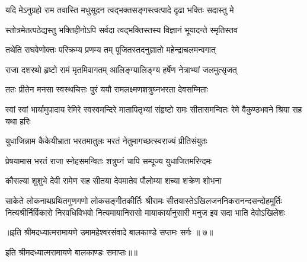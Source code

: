 \twolineshloka
{यदि मेऽनुग्रहो राम तवास्ति मधुसूदन}
{त्वद्भक्तसङ्गस्त्वत्पादे दृढा भक्तिः सदास्तु मे} %

\twolineshloka
{स्तोत्रमेतत्पठेद्यस्तु भक्तिहीनोऽपि सर्वदा}
{त्वद्भक्तिस्तस्य विज्ञानं भूयादन्ते स्मृतिस्तव} %

\twolineshloka
{तथेति राघवेणोक्तः परिक्रम्य प्रणम्य तम्}
{पूजितस्तदनुज्ञातो महेन्द्राचलमन्वगात्} %

\twolineshloka
{राजा दशरथो हृष्टो रामं मृतमिवागतम्}
{आलिङ्ग्यालिङ्ग्य हर्षेण नेत्राभ्यां जलमुत्सृजत्} %

\twolineshloka
{ततः प्रीतेन मनसा स्वस्थचित्तः पुरं ययौ}
{रामलक्ष्मणशत्रुघ्नभरता देवसम्मिताः} %

\threelineshloka
{स्वां स्वां भार्यामुपादाय रेमिरे स्वस्वमन्दिरे}
{मातापितृभ्यां संहृष्टो रामः सीतासमन्वितः}
{रेमे वैकुण्ठभवने श्रिया सह यथा हरिः} %

\twolineshloka
{युधाजिन्नाम कैकेयीभ्राता भरतमातुलः}
{भरतं नेतुमागच्छत्स्वराज्यं प्रीतिसंयुतः} %

\twolineshloka
{प्रेषयामास भरतं राजा स्नेहसमन्वितः}
{शत्रुघ्नं चापि सम्पूज्य युधाजितमरिन्दमः} %

\twolineshloka
{कौसल्या शुशुभे देवी रामेण सह सीतया}
{देवमातेव पौलोम्या शच्या शक्रेण शोभना} %

\fourlineindentedshloka
{साकेते लोकनाथप्रथितगुणगणो लोकसङ्गीतकीर्तिः}
{श्रीरामः सीतयास्तेऽखिलजननिकरानन्दसन्दोहमूर्तिः}
{नित्यश्रीर्निर्विकारो निरवधिविभवो नित्यमायानिरासो}
{मायाकार्यानुसारी मनुज इव सदा भाति देवोऽखिलेशः} %

{॥इति श्रीमदध्यात्मरामायणे उमामहेश्वरसंवादे
बालकाण्डे सप्तमः सर्गः ॥ ७॥
}

इति श्रीमदध्यात्मरामायणे बालकाण्डः समाप्तः॥॥
